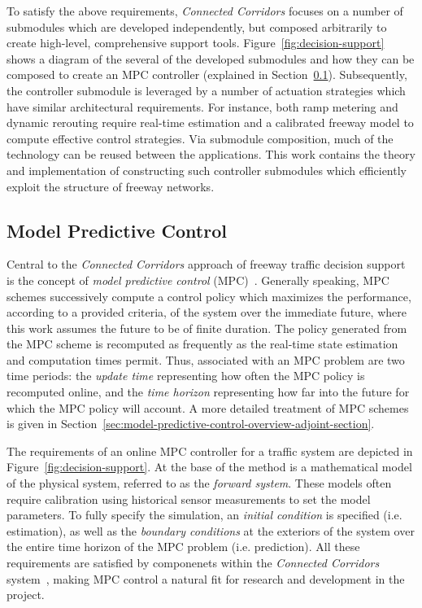 To satisfy the above requirements, \emph{Connected Corridors} focuses on a number of submodules which are developed independently, but composed arbitrarily to create high-level, comprehensive support tools. Figure~\ref{fig:decision-support} shows a diagram of the several of the developed submodules and how they can be composed to create an MPC controller (explained in Section~\ref{sec:model-predictive-control}). Subsequently, the controller submodule is leveraged by a number of actuation strategies which have similar architectural requirements. For instance, both ramp metering and dynamic rerouting require real-time estimation and a calibrated freeway model to compute effective control strategies. Via submodule composition, much of the technology can be reused between the applications. This work contains the theory and implementation of constructing such controller submodules which efficiently exploit the structure of freeway networks.

\subsection{Model Predictive Control}
\label{sec:model-predictive-control}

Central to the \emph{Connected Corridors} approach of freeway traffic decision support is the concept of \emph{model predictive control} (MPC)~\cite{Muralidharana,o2013splitting,Frejo2011}. Generally speaking, MPC schemes successively compute a control policy which maximizes the performance, according to a provided criteria, of the system over the immediate future, where this work assumes the future to be of finite duration. The policy generated from the MPC scheme is recomputed as frequently as the real-time state estimation and computation times permit. Thus, associated with an MPC problem are two time periods: the \emph{update time} representing how often the MPC policy is recomputed online, and the \emph{time horizon} representing how far into the future for which the MPC policy will account. A more detailed treatment of MPC schemes is given in Section~\ref{sec:model-predictive-control-overview-adjoint-section}.

The requirements of an online MPC controller for a traffic system are depicted in Figure~\ref{fig:decision-support}. At the base of the method is a mathematical model of the physical system, referred to as the \emph{forward system}. These models often require calibration using historical sensor measurements to set the model parameters. To fully specify the simulation, an \emph{initial condition} is specified (i.e. estimation), as well as the \emph{boundary conditions} at the exteriors of the system over the entire time horizon of the MPC problem (i.e. prediction). All these requirements are satisfied by componenets within the \emph{Connected Corridors} system~\cite{Muralidharan2009b,dervisoglu2014macroscopic,work2010traffic}, making MPC control a natural fit for research and development in the project.

